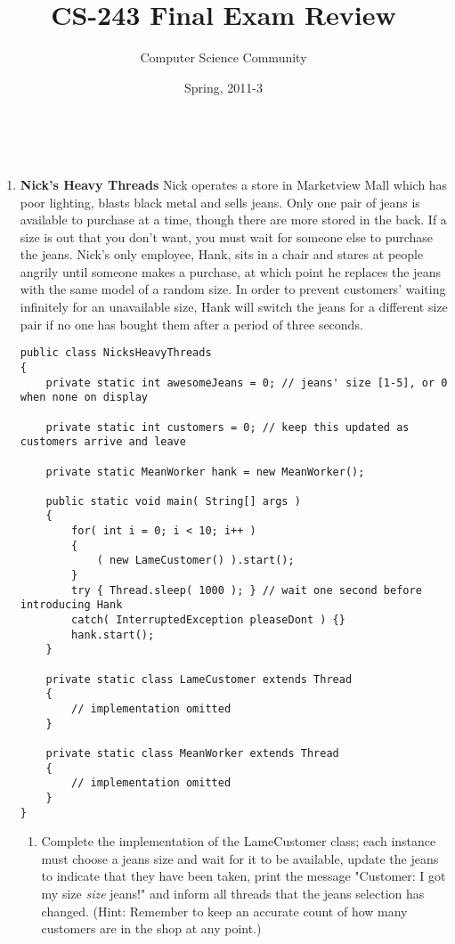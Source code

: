 \documentclass[11pt]{article}
\author{Computer Science Community}
\title{CS-243 Final Exam Review}
\date{Spring, 2011-3}
\makeatletter
\let\thetitle\@title
\let\thedate\@date
\makeatother
\begin{document}
\noindent{\Large \thetitle \hfill \thedate}\\

\begin{enumerate}

\item {\bf Nick's Heavy Threads} Nick operates a store in Marketview Mall which
      has poor lighting, blasts black metal and sells jeans. Only one pair of
      jeans is available to purchase at a time, though there are more
      stored in the back. If a size is out that you don't want, you must
      wait for someone else to purchase the jeans. Nick's only employee, Hank,
      sits in a chair and stares at people angrily until someone makes a
      purchase, at which point he replaces the jeans with the same model of a random
      size. In order to prevent customers' waiting infinitely for an unavailable
      size, Hank will switch the jeans for a different size pair if no one has
      bought them after a period of three seconds.
    
\begin{lstlisting}
public class NicksHeavyThreads
{
    private static int awesomeJeans = 0; // jeans' size [1-5], or 0 when none on display
    
    private static int customers = 0; // keep this updated as customers arrive and leave
    
    private static MeanWorker hank = new MeanWorker();
    
    public static void main( String[] args )
    {
        for( int i = 0; i < 10; i++ )
        {
            ( new LameCustomer() ).start();
        }
        try { Thread.sleep( 1000 ); } // wait one second before introducing Hank
        catch( InterruptedException pleaseDont ) {}
        hank.start();
    }
    
    private static class LameCustomer extends Thread
    {
        // implementation omitted
    }
    
    private static class MeanWorker extends Thread
    {
        // implementation omitted
    }
}
\end{lstlisting}

    \begin{enumerate}
    
    \item Complete the implementation of the LameCustomer class; each instance must
          choose a jeans size and wait for it to be available, update the jeans to
          indicate that they have been taken, print the message
          "Customer: I got my size \emph{size} jeans!" and inform all threads that
          the jeans selection has changed.
          (Hint: Remember to keep an accurate count of how many customers are in
          the shop at any point.)


\end{enumerate}
\end{enumerate}
\end{document}
